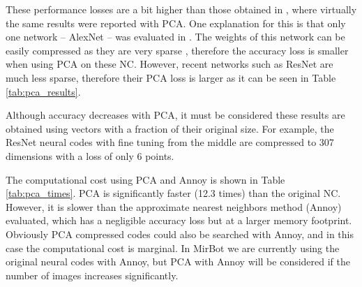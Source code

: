 \documentclass[final, twocolumn]{elsarticle}
\begin{document}
These performance losses are a bit higher than those obtained in \cite{BabenkoSCL14}, where virtually the same results were reported with PCA. One explanation for this is that only one network -- AlexNet \cite{Krizhevsky2012ImageNetNetworks} -- was evaluated in \cite{BabenkoSCL14}. The weights of this network can be easily compressed as they are very sparse \cite{Sparse}, therefore  the accuracy loss is smaller when using PCA on these NC. However, recent networks such as ResNet are much less sparse, therefore their PCA loss is larger as it can be seen in Table \ref{tab:pca_results}.

Although accuracy decreases with PCA, it must be considered these results are obtained using vectors with a fraction of their original size. For example, the ResNet neural codes with fine tuning from the middle are compressed to 307 dimensions with a loss of only 6 points.

The computational cost using PCA and Annoy is shown in Table \ref{tab:pca_times}. PCA is significantly faster (12.3 times) than the original NC. However, it is slower than the approximate nearest neighbors method (Annoy) evaluated, which has a negligible accuracy loss but at a larger memory footprint. Obviously PCA compressed codes could also be searched with Annoy, and in this case the computational cost is marginal. In MirBot we are currently using the original neural codes with Annoy, but PCA with Annoy will be considered if the number of images increases significantly. %
\end{document}
